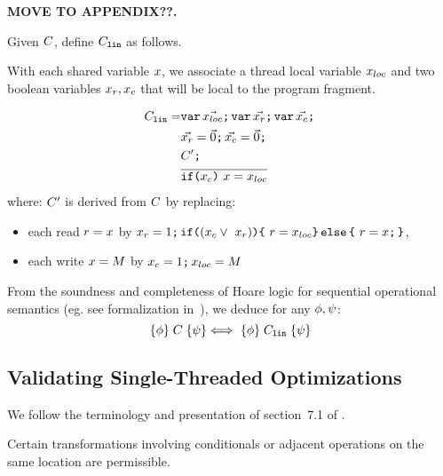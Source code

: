 {\bf MOVE TO APPENDIX??.  

Given $C$, define 
$C_{{\tt lin}}$ as follows.
\begin{definition}
With each shared variable $x$, we associate a thread local variable $x_{{loc}}$ and two boolean variables $x_{r},x_{c}$ that will be local to the program fragment.  

\begin{align*}
C_{{\tt lin}}= & \texttt{var}\,\vec{x_{{loc}}} \texttt{;}\,\allowbreak \texttt{var}\, \vec{x_{r}} \texttt{;}\,\allowbreak \texttt{var}\, \vec{x_{c}} \texttt{;}\,\allowbreak  \\
& \vec{x_{r}} =\vec{0} \texttt{;}\,\allowbreak \vec{x_{c}} = \vec{0} \texttt{;}\,\allowbreak \\
& C' \texttt{;}\,\allowbreak   \\
& \overline{\texttt{if}\allowbreak\texttt{(}x_{c}\texttt{)}\  x= x_{{loc}}}
\end{align*}
where:
$C'$ is derived from $C$ by replacing:
\begin{itemize}
\item  each read $r = x$ by $\aRead = 1 \SEMI \IF {(\aChanged \lor\ \aRead)} \THEN\  \aReg= \aLocLoc \ELSE\  \aReg= \aLoc \SEMI \FI $,
\item each write $x = M$ by $x_{c} =1 \texttt{;}\,\allowbreak x_{{loc}} = M$
\end{itemize}
\end{definition}
From the soundness and completeness of Hoare logic for sequential operational semantics (eg. see formalization in~\citet{gordonHoare}), we deduce for any $\phi, \psi$: 
\[ \{\phi\}\allowbreak\;C\;\allowbreak\{\psi\}  \Longleftrightarrow\  \{\phi\}\allowbreak\;C_{{\tt lin}}\;\allowbreak\{\psi\} \]
}

\subsection{Validating Single-Threaded Optimizations}
We follow the terminology and presentation of section~7.1 of
\citet{Dolan:2018:BDR:3192366.3192421}.  

Certain transformations involving conditionals or adjacent operations on the same location are permissible. 
 
